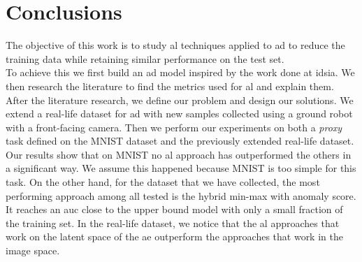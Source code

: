 \chapter{Conclusions}
\label{chap:conclusions}


 

 


The objective of this work is to study \acrfull{al} techniques applied to \acrfull{ad} to reduce the training data while retaining similar performance on the test set.
\\

To achieve this we first build an \acrshort{ad} model inspired by the work done at \acrfull{idsia}. We then research the literature to find the metrics used for \acrshort{al} and explain them. After the literature research, we define our problem and design our solutions. We extend a real-life dataset for \acrshort{ad} with new samples collected using a ground robot with a front-facing camera. Then we perform our experiments on both a \emph{proxy} task defined on the MNIST dataset and the previously extended real-life dataset.
\\  
    
Our results show that on MNIST no \acrshort{al} approach has outperformed the others in a significant way. We assume this happened because MNIST is too simple for this task. On the other hand, for the dataset that we have collected, the most performing approach among all tested is the hybrid min-max with anomaly score. It reaches an \acrfull{auc} close to the upper bound model with only a small fraction of the training set. In the real-life dataset, we notice that the \acrshort{al} approaches that work on the latent space of the \acrfull{ae} outperform the approaches that work in the image space.

